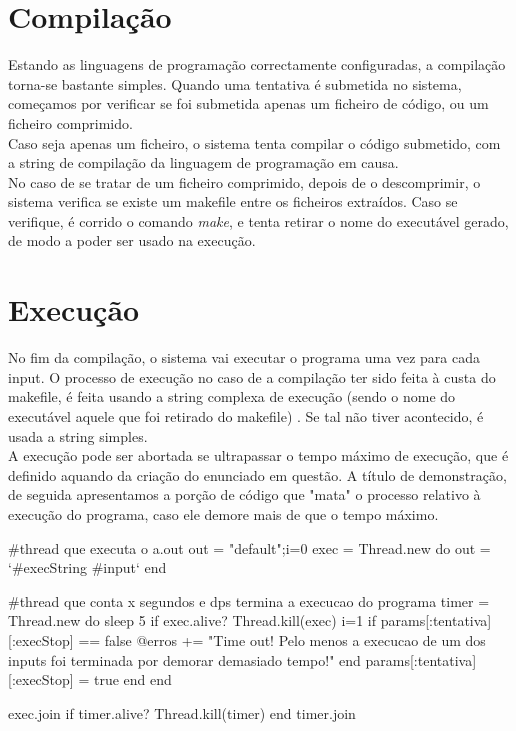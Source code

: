 \section{Compilação}\label{sec comp}

Estando as linguagens de programação correctamente configuradas, a compilação torna-se bastante simples. Quando uma tentativa
é submetida no sistema, começamos por verificar se foi submetida apenas um ficheiro de código, ou um ficheiro comprimido.\\
Caso seja apenas um ficheiro, o sistema tenta compilar o código submetido, com a string de compilação da linguagem de programação em causa.\\
No caso de se tratar de um ficheiro comprimido, depois de o descomprimir, o sistema verifica se existe um makefile entre os ficheiros extraídos. Caso se verifique, é corrido o comando \textit{make}, e tenta retirar o nome do executável gerado, de modo a poder
ser usado na execução.

\section{Execução}\label{sec exec}
No fim da compilação, o sistema vai executar o programa uma vez para cada input. O processo de execução no caso de a compilação ter
sido feita à custa do makefile, é feita usando a string complexa de execução (sendo o nome do executável aquele que foi retirado do
makefile) . Se tal não tiver acontecido, é usada a string simples.\\
A execução pode ser abortada se ultrapassar o tempo máximo de execução, que é definido aquando da criação do enunciado em
questão. A título de demonstração, de seguida apresentamos a porção de código que "mata" o processo relativo à execução do programa,
caso ele demore mais de que o tempo máximo.

\begin{haskell}
    #thread que executa o a.out 
    out = "default";i=0
    exec = Thread.new do
      out = `#{execString} #{input}`
    end
    
    #thread que conta x segundos e dps termina a execucao do programa
    timer = Thread.new do
      sleep 5
      if exec.alive?
        Thread.kill(exec)
        i=1
        if params[:tentativa][:execStop] == false
          @erros += "Time out! Pelo menos a execucao de um dos inputs foi terminada por demorar demasiado tempo!"
        end
        params[:tentativa][:execStop] = true
      end
    end
    
    exec.join
    if timer.alive?
      Thread.kill(timer)
    end
    timer.join

\end{haskell}

